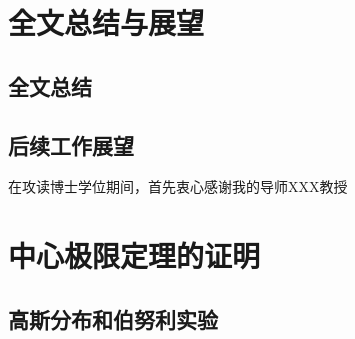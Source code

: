 \documentclass[master]{thesis-uestc}
\begin{document}
\chapter{全文总结与展望}

\section{全文总结}

\section{后续工作展望}

\thesisacknowledgement
在攻读博士学位期间，首先衷心感谢我的导师XXX教授

\thesisappendix

\chapter{中心极限定理的证明}

\section{高斯分布和伯努利实验}




%
% 
%
% 
% 
%

\end{document}
